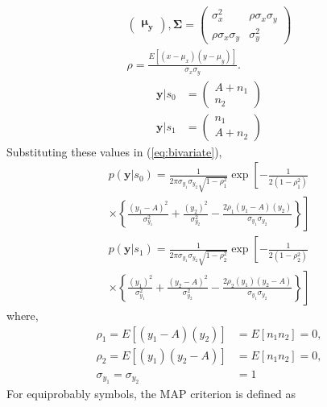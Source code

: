 \documentclass{article}
\numberwithin{equation}{subsection}
\numberwithin{figure}{subsection}
\providecommand{\mbf}{\mathbf}
\providecommand{\cbrak}[1]{\ensuremath{\left\{#1\right\}}}
\providecommand{\brak}[1]{\ensuremath{\left(#1\right)}}
\providecommand{\lsbrak}[1]{\ensuremath{{}\left[#1\right.}}
\providecommand{\rsbrak}[1]{\ensuremath{{}\left.#1\right]}}
\providecommand{\sbrak}[1]{\ensuremath{{}\left[#1\right]}}
\renewcommand\thesection{\arabic{section}}
\renewcommand\thesubsection{\thesection.\arabic{subsection}}
\begin{document}
\begin{enumerate}[label=\thesubsection.\arabic*,ref=\thesubsection.\arabic{figure}]
\begin{align}
\begin{pmatrix}
\mbf{\mu_y}
\end{pmatrix} , \mbf{\Sigma} = \begin{pmatrix}
\sigma_x^2 & \rho\sigma_x\sigma_y \\
    \rho\sigma_x\sigma_y & \sigma_y^2
\end{pmatrix} \\
\rho = \frac{E\sbrak{\brak{x - \mu_x}\brak{y-\mu_y}}}{\sigma_x\sigma_y}.
    \end{align}
        \begin{align}
        \mbf{y}|s_0 &= 
        \begin{pmatrix}
        A+n_1 \\
        n_2
        \end{pmatrix}\\
        \mbf{y}|s_1 &=  
        \begin{pmatrix}
        n_1 \\
        A+n_2
        \end{pmatrix}
        \end{align}
        Substituting these values in (\ref{eq:bivariate}),
        \begin{multline}
        \label{gauss_mutl_var1}
        p\brak{\mbf{y}|s_0} = \frac{1}{2\pi\sigma_{y_1}\sigma_{y_2}\sqrt{1-\rho_1^2}}\exp\lsbrak{-\frac{1}{2\brak{1-\rho_1^2}}}
        \\
        \times \rsbrak{\cbrak{\frac{\brak{y_1-A}^2}{\sigma_{y_1}^2}+\frac{\brak{y_2}^2}{\sigma_{y_2}^2}-\frac{2\rho_1\brak{y_1-A}\brak{y_2}}{\sigma_{y_1}\sigma_{y_2}}}}
        \end{multline}
        \begin{multline}
        \label{gauss_mutl_var2}
        p\brak{\mbf{y}|s_1} = \frac{1}{2\pi\sigma_{y_1}\sigma_{y_2}\sqrt{1-\rho_2^2}}\exp\lsbrak{-\frac{1}{2\brak{1-\rho_2^2}}}
        \\
        \times \rsbrak{\cbrak{\frac{\brak{y_1}^2}{\sigma_{y_1}^2}+\frac{\brak{y_2-A}^2}{\sigma_{y_2}^2}-\frac{2\rho_2\brak{y_1}\brak{y_2-A}}{\sigma_{y_1}\sigma_{y_2}}}}
        \end{multline}
        where,
        \begin{align}
        \label{rho_sig_val}
        \rho_1 = E[(y_1-A)(y_2)] &= E[n_1 n_2] = 0, \nonumber \\
        \rho_2 = E[(y_1)(y_2-A)] &= E[n_1 n_2] = 0, \nonumber \\
        \sigma_{y_1} = \sigma_{y_2} &= 1
        \end{align}
         For equiprobably symbols, the MAP criterion is defined as

\end{enumerate}
\end{document}
